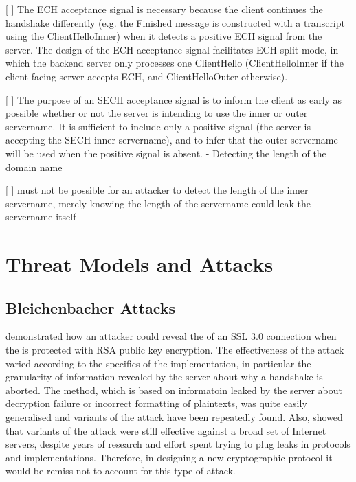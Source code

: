 [ ]  The ECH acceptance signal is necessary because the client continues the handshake differently (e.g. the Finished message is constructed with a transcript using the ClientHelloInner) when it detects a positive ECH  signal from the server. The design of the ECH acceptance signal facilitates ECH split-mode, in which the backend server only processes one ClientHello (ClientHelloInner if the client-facing server accepts ECH, and ClientHelloOuter otherwise).

[ ] The purpose of an SECH acceptance signal is to inform the client as early as possible whether or not the server is intending to use the inner or outer servername. It is sufficient to include only a positive signal (the server is accepting the SECH inner servername), and to infer that the outer servername will be used when the positive signal is absent.
    - Detecting the length of the domain name

[ ] must not be possible for an attacker to detect the length of the inner servername, merely knowing the length of the servername could leak the servername itself


\section{Threat Models and Attacks}

\subsection{Bleichenbacher Attacks \label{bleichenbacher-attack}}
\cite{bleichenbacher1998chosen} demonstrated how an attacker could reveal the \premastersecret{} of an \ac{SSL} 3.0 connection when the \premastersecret{} is protected with \ac{RSA} public key encryption.
The effectiveness of the attack varied according to the specifics of the implementation, in particular the granularity of information revealed by the server about why a handshake is aborted.
The method, which is based on informatoin leaked by the server about decryption failure or incorrect formatting of plaintexts, was quite easily generalised and variants of the attack have been repeatedly found.
Also, \cite{boeck2018robot} showed that variants of the attack were still effective against a broad set of Internet servers, despite years of research and effort spent trying to plug leaks in protocols and implementations.
Therefore, in designing a new cryptographic protocol it would be remiss not to account for this type of attack.

